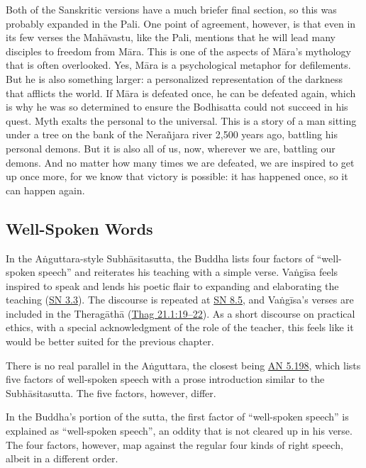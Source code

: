 \documentclass[12pt,openany]{book}%
\begin{document}
Both of the Sanskritic versions have a much briefer final section, so this was probably expanded in the Pali. One point of agreement, however, is that even in its few verses the \textsanskrit{Mahāvastu}, like the Pali, mentions that he will lead many disciples to freedom from \textsanskrit{Māra}. This is one of the aspects of \textsanskrit{Māra}’s mythology that is often overlooked. Yes, \textsanskrit{Māra} is a psychological metaphor for defilements. But he is also something larger: a personalized representation of the darkness that afflicts the world. If \textsanskrit{Māra} is defeated once, he can be defeated again, which is why he was so determined to ensure the Bodhisatta could not succeed in his quest. Myth exalts the personal to the universal. This is a story of a man sitting under a tree on the bank of the \textsanskrit{Nerañjara} river 2,500 years ago, battling his personal demons. But it is also all of us, now, wherever we are, battling our demons. And no matter how many times we are defeated, we are inspired to get up once more, for we know that victory is possible: it has happened once, so it can happen again.

\subsection*{Well-Spoken Words}

In the \textsanskrit{Aṅguttara}-style \textsanskrit{Subhāsitasutta}, the Buddha lists four factors of “well-spoken speech” and reiterates his teaching with a simple verse. \textsanskrit{Vaṅgīsa} feels inspired to speak and lends his poetic flair to expanding and elaborating the teaching (\href{https://suttacentral.net/snp3.3/en/sujato}{SN 3.3}). The discourse is repeated at \href{https://suttacentral.net/snp8.5/en/sujato}{SN 8.5}, and \textsanskrit{Vaṅgīsa}’s verses are included in the \textsanskrit{Theragāthā} (\href{https://suttacentral.net/thag21.1/en/sujato\#19}{Thag 21.1:19–22}). As a short discourse on practical ethics, with a special acknowledgment of the role of the teacher, this feels like it would be better suited for the previous chapter.

There is no real parallel in the \textsanskrit{Aṅguttara}, the closest being \href{https://suttacentral.net/an5.198/en/sujato}{AN 5.198}, which lists five factors of well-spoken speech with a prose introduction similar to the \textsanskrit{Subhāsitasutta}. The five factors, however, differ.

In the Buddha’s portion of the sutta, the first factor of “well-spoken speech” is explained as “well-spoken speech”, an oddity that is not cleared up in his verse. The four factors, however, map against the regular four kinds of right speech, albeit in a different order.
\end{document}
